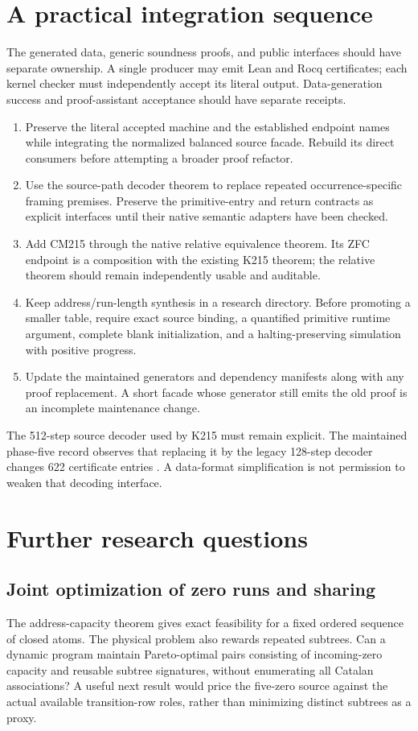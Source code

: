 \documentclass[11pt,letterpaper]{article}
\begin{document}
\section{A practical integration sequence}
The generated data, generic soundness proofs, and public interfaces should have separate ownership. A single producer may emit Lean and Rocq certificates; each kernel checker must independently accept its literal output. Data-generation success and proof-assistant acceptance should have separate receipts.

\begin{enumerate}
\item Preserve the literal accepted machine and the established endpoint names while integrating the normalized balanced source facade. Rebuild its direct consumers before attempting a broader proof refactor.
\item Use the source-path decoder theorem to replace repeated occurrence-specific framing premises. Preserve the primitive-entry and return contracts as explicit interfaces until their native semantic adapters have been checked.
\item Add CM215 through the native relative equivalence theorem. Its ZFC endpoint is a composition with the existing K215 theorem; the relative theorem should remain independently usable and auditable.
\item Keep address/run-length synthesis in a research directory. Before promoting a smaller table, require exact source binding, a quantified primitive runtime argument, complete blank initialization, and a halting-preserving simulation with positive progress.
\item Update the maintained generators and dependency manifests along with any proof replacement. A short facade whose generator still emits the old proof is an incomplete maintenance change.
\end{enumerate}
The 512-step source decoder used by K215 must remain explicit. The maintained phase-five record observes that replacing it by the legacy 128-step decoder changes 622 certificate entries \cite{phase5}. A data-format simplification is not permission to weaken that decoding interface.

\section{Further research questions}
\subsection{Joint optimization of zero runs and sharing}
The address-capacity theorem gives exact feasibility for a fixed ordered sequence of closed atoms. The physical problem also rewards repeated subtrees. Can a dynamic program maintain Pareto-optimal pairs consisting of incoming-zero capacity and reusable subtree signatures, without enumerating all Catalan associations? A useful next result would price the five-zero source against the actual available transition-row roles, rather than minimizing distinct subtrees as a proxy.
\end{document}
